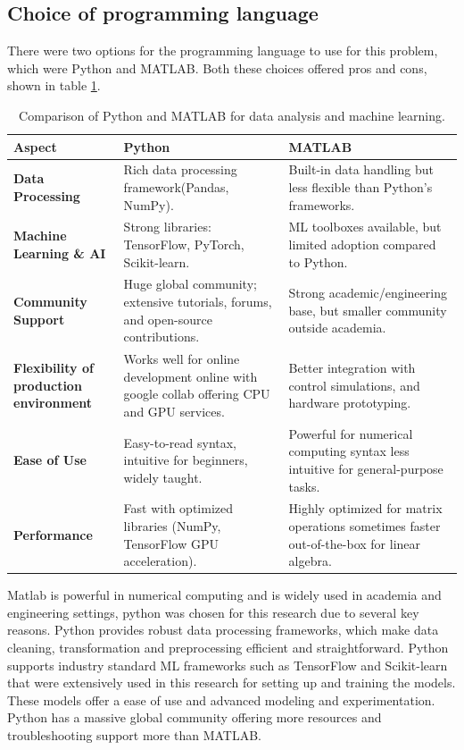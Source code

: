 \subsection{Choice of programming language}
There were two options for the programming language to use for this problem, which were Python and MATLAB. Both these choices offered pros and cons, shown in table \ref{tab:python_matlab_comparison}.
\begin{table}[h!]
	\centering
	\renewcommand{\arraystretch}{1.8} %
	\begin{tabular}{|p{3.5cm}|p{5.5cm}|p{5.5cm}|}
		\hline
		\textbf{Aspect} & \textbf{Python} & \textbf{MATLAB} \\
		\hline
		\textbf{Data Processing} & Rich data processing framework(Pandas, NumPy). & Built-in data handling but less flexible than Python’s frameworks. \\
		\hline
		\textbf{Machine Learning \& AI} & Strong libraries: TensorFlow, PyTorch, Scikit-learn. & ML toolboxes available, but limited adoption compared to Python. \\
		\hline
		\textbf{Community Support} & Huge global community; extensive tutorials, forums, and open-source contributions. & Strong academic/engineering base, but smaller community outside academia. \\
		\hline
		\textbf{Flexibility of production environment} & Works well for online development online with google collab offering CPU and GPU services. & Better integration with control simulations, and hardware prototyping. \\
		\hline
		\textbf{Ease of Use} & Easy-to-read syntax, intuitive for beginners, widely taught. & Powerful for numerical computing syntax less intuitive for general-purpose tasks. \\
		\hline
		\textbf{Performance} & Fast with optimized libraries (NumPy, TensorFlow GPU acceleration). & Highly optimized for matrix operations sometimes faster out-of-the-box for linear algebra. \\
		\hline
	\end{tabular}
	\caption{Comparison of Python and MATLAB for data analysis and machine learning.}
	\label{tab:python_matlab_comparison}
\end{table}

Matlab is powerful in numerical computing and is widely used in academia and engineering settings, python was chosen for this research due to several key reasons. Python provides robust data processing frameworks, which make data cleaning, transformation and preprocessing efficient and straightforward. Python supports industry standard ML frameworks such as TensorFlow and Scikit-learn that were extensively used in this research for setting up and training the models. These models offer a ease of use and advanced modeling and experimentation. Python has a massive global community offering more resources and troubleshooting support more than MATLAB.


